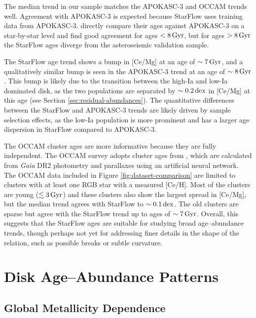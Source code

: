 \documentclass[twocolumn,twocolappendix]{aastex701}
\newcommand{\Gyr}{\,{\rm Gyr}}
\newcommand{\dex}{\,{\rm dex}}
\begin{document}
The median trend in our sample matches the APOKASC-3 and OCCAM trends well. Agreement with APOKASC-3 is expected because StarFlow uses training data from APOKASC-3. \citet{stone-martinez_starflow_2025} directly compare their ages against APOKASC-3 on a star-by-star level and find good agreement for ages $< 8\Gyr$, but for ages $>8\Gyr$ the StarFlow ages diverge from the asteroseismic validation sample. 

The StarFlow age trend shows a bump in [Ce/Mg] at an age of $\sim7\Gyr$, and a qualitatively similar bump is seen in the APOKASC-3 trend at an age of $\sim8\Gyr$. This bump is likely due to the transition between the high-Ia and low-Ia dominated disk, as the two populations are separated by $\sim0.2\dex$ in [Ce/Mg] at this age (see Section \ref{sec:residual-abundances}). The quantitative differences between the StarFlow and APOKASC-3 trends are likely driven by sample selection effects, as the low-Ia population is more prominent and has a larger age dispersion in StarFlow compared to APOKASC-3.

The OCCAM cluster ages are more informative because they are fully independent. The OCCAM survey adopts cluster ages from \citet{cantat-gaudin_painting_2020}, which are calculated from {\it Gaia} DR2 \citep{gaia_dr2_2018} photometry and parallaxes using an artificial neural network. The OCCAM data included in Figure \ref{fig:dataset-comparison} are limited to clusters with at least one RGB star with a measured [Ce/H]. Most of the clusters are young ($\lesssim3\Gyr$) and these clusters also show the largest spread in [Ce/Mg], but the median trend agrees with StarFlow to $\sim0.1\dex$. The old clusters are sparse but agree with the StarFlow trend up to ages of $\sim7\Gyr$. Overall, this suggests that the StarFlow ages are suitable for studying broad age--abundance trends, though perhaps not yet for addressing finer details in the shape of the relation, such as possible breaks or subtle curvature.

\section{Disk Age--Abundance Patterns}
\label{sec:results}

\subsection{Global Metallicity Dependence}
\label{sec:metallicity-trends}
\end{document}
